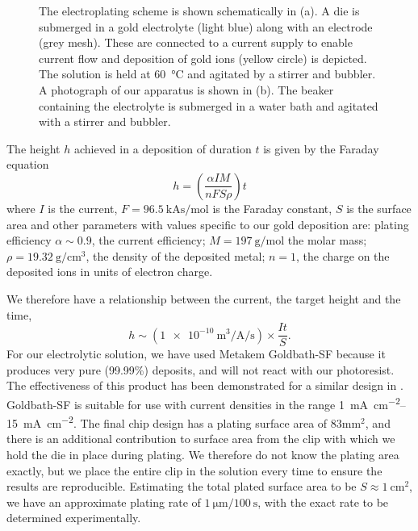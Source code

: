 \begin{figure}[phtb]
{
  } %
  \caption{
    The electroplating scheme is shown schematically in (a). A die is submerged in a gold electrolyte
    (light blue) along with an electrode (grey mesh). These are connected to a
    current supply to enable current flow and deposition of gold ions (yellow
    circle)  is depicted. The solution is held at \SI{60}{\celsius} and
    agitated by a stirrer and bubbler. A photograph of our apparatus is shown
    in (b). The beaker containing the electrolyte is submerged in a water bath
    and agitated with a stirrer and bubbler.
  }
  \label{fab:fig:eplate}
\end{figure}

The height $h$ achieved in a deposition of duration $t$ is given by the Faraday
equation~\cite{Ruythooren_2000}
%
\begin{equation}
  h = \left(\frac{\alpha I M}{nFS\rho}\right)t
  \label{fab:eqn:faraday}
\end{equation}
%
where $I$ is the current, $F=\SI{96.5}{\kilo\ampere\second\per\mole}$ is the
Faraday constant, $S$ is the surface area and other parameters with values
specific to our gold deposition are: plating efficiency $\alpha\sim0.9$, the current efficiency;
$M = \SI{197}{\gram\per\mole}$ the molar mass;
$\rho=\SI{19.32}{\gram\per\centi\meter\cubed}$, the density of the deposited
metal; $n=1$, the charge on the deposited ions in units of electron charge.

We therefore have a relationship between the current, the target height and the
time,
%
\begin{equation}
  h \sim \left(
  \SI[per-mode=fraction]{1e-10}{\meter\cubed\per\ampere\per\second} \right)
  \times\frac{It}{S}.
\end{equation}
%
For our electrolytic solution, we have used Metakem Goldbath-SF because it
produces very pure (99.99\%) deposits, and will not react with our photoresist.
The effectiveness of this product has been demonstrated for a similar design in
.
%
Goldbath-SF is suitable for use with current densities in the range
\SIrange{1}{15}{\milli\ampere\per\centi\meter\squared}. The final chip design
has a plating surface area of $83\si{\milli\meter\squared}$, and there is an
additional contribution to surface area from the clip with which we hold the
die in place during plating. We therefore do not know the plating area exactly,
but we place the entire clip in the solution every time to ensure the
results are reproducible. Estimating the total plated surface area to be
$S\approx\SI{1}{\centi\meter\squared}$, we have an approximate plating rate of
$\SI{1}{\micro\meter}/\SI{100}{\second}$, with the exact rate to be determined
experimentally.

